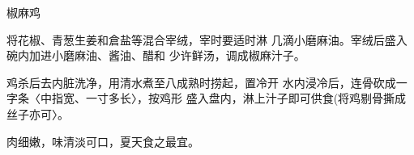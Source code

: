 \begin{recipe}{椒麻鸡}

\ingredients




\cooking

将花椒、青葱生姜和倉盐等混合宰绒，宰时要适时淋 几滴小磨麻油。宰绒后盛入碗内加进小磨麻油、酱油、醋和 少许鲜汤，调成椒麻汁子。

鸡杀后去内脏洗净，用清水煮至八成熟时捞起，置冷开 水内浸冷后，连骨砍成一字条〈中指宽、一寸多长〉，按鸡形 盛入盘内，淋上汁子即可供食(将鸡剔骨撕成丝子亦可〉。

\notes

肉细嫩，味清淡可口，夏天食之最宜。

\end{recipe}

